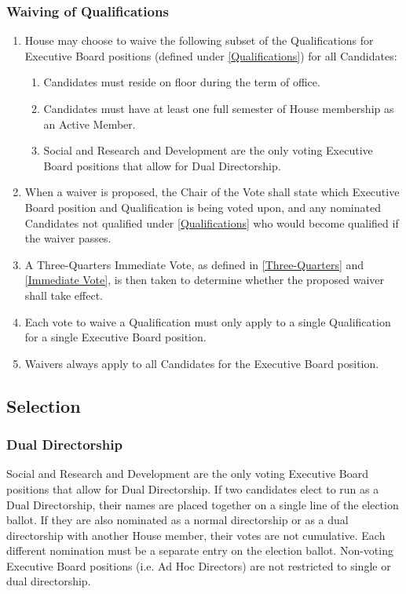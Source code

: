 \documentclass{article}
\newcommand{\asection}[1]{\subsection{#1} \label{#1}}
\newcommand{\asubsection}[1]{\subsubsection{#1} \label{#1}}
\begin{document}
\asubsection{Waiving of Qualifications}
\begin{enumerate}
  \item House may choose to waive the following subset of the Qualifications for Executive Board positions (defined under \ref{Qualifications}) for all Candidates:
    \begin{enumerate}
      \item Candidates must reside on floor during the term of office.
      \item Candidates must have at least one full semester of House membership as an Active Member.
      \item Social and Research and Development are the only voting Executive Board positions that allow for Dual Directorship.
    \end{enumerate}
  \item When a waiver is proposed, the Chair of the Vote shall state which Executive Board position and Qualification is being voted upon, and any nominated Candidates not qualified under \ref{Qualifications} who would become qualified if the waiver passes.
  \item A Three-Quarters Immediate Vote, as defined in \ref{Three-Quarters} and \ref{Immediate Vote}, is then taken to determine whether the proposed waiver shall take effect.
  \item Each vote to waive a Qualification must only apply to a single Qualification for a single Executive Board position.
  \item Waivers always apply to all Candidates for the Executive Board position.
\end{enumerate}

\asection{Selection}
\asubsection{Dual Directorship}
Social and Research and Development are the only voting Executive Board positions that allow for Dual Directorship.
If two candidates elect to run as a Dual Directorship, their names are placed together on a single line of the election ballot.
If they are also nominated as a normal directorship or as a dual directorship with another House member, their votes are not cumulative.
Each different nomination must be a separate entry on the election ballot.
Non-voting Executive Board positions (i.e. Ad Hoc Directors) are not restricted to single or dual directorship.
\end{document}
